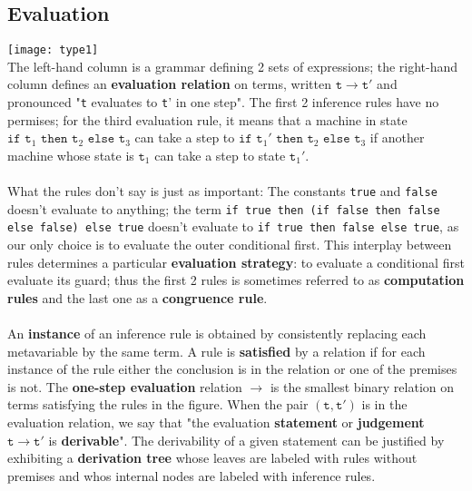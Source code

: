 \documentclass{article}
\begin{document}
\subsection{Evaluation}
\texttt{[image: type1]}\\
The left-hand column is a grammar defining 2 sets of expressions; the right-hand column defines an \textbf{evaluation relation} on terms, written \(\texttt{t}\to \texttt{t}'\) and pronounced "\texttt{t} evaluates to \texttt{t}' in one step".
The first 2 inference rules have no permises; for the third evaluation rule, it means that a machine in state \(\texttt{if t}_{1}\texttt{ then t}_{2}\texttt{ else t}_{3}\) can take a step to \(\texttt{if t}_{1}'\texttt{ then t}_{2}\texttt{ else t}_{3}\) 
if another machine whose state is \(\texttt{t}_{1}\) can take a step to state \(\texttt{t}_{1}'\).\\\\
What the rules don't say is just as important: The constants \texttt{true} and \texttt{false} doesn't evaluate to anything; the term \texttt{if true then (if false then false else false) else true} doesn't evaluate to \texttt{if true then false else true}, as our only choice 
is to evaluate the outer conditional first. This interplay between rules determines a particular \textbf{evaluation strategy}: to evaluate a conditional first evaluate its guard; thus the first 2 rules is sometimes referred to as \textbf{computation rules} and the last one as a \textbf{congruence rule}.\\\\
An \textbf{instance} of an inference rule is obtained by consistently replacing each metavariable by the same term. A rule is \textbf{satisfied} by a relation if for each instance of the rule either the conclusion is in the relation or one of the premises is not. 
The \textbf{one-step evaluation} relation \(\to\) is the smallest binary relation on terms satisfying the rules in the figure. When the pair \((\texttt{t},\texttt{t}')\) is in the evaluation relation, 
we say that "the evaluation \textbf{statement} or \textbf{judgement} \(\texttt{t}\to \texttt{t}'\) is \textbf{derivable}". The derivability of a given statement can be justified by exhibiting a \textbf{derivation tree} whose leaves are labeled with rules without premises and whos internal nodes are labeled with inference rules.\\
\end{document}
